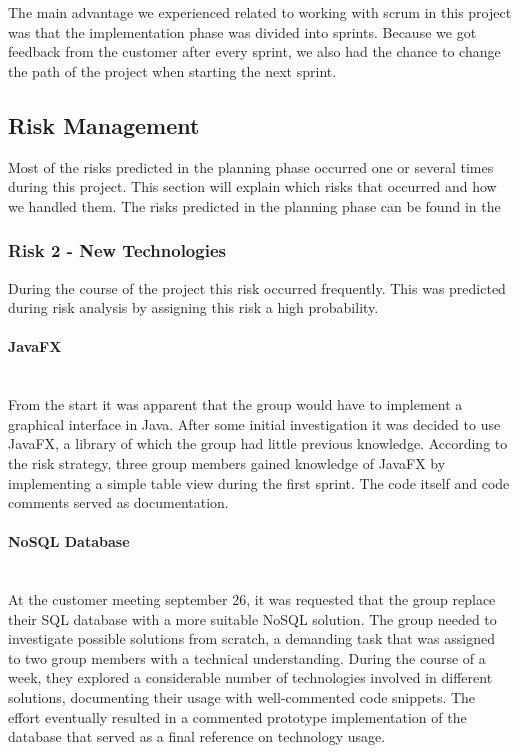 \documentclass[../document]{subfiles}
\begin{document}
The main advantage we experienced related to working with scrum in this project was that the implementation phase was divided into sprints. Because we got feedback from the customer after every sprint, we also had the chance to change the path of the project when starting the next sprint.  

\subsection{Risk Management}
\label{risk_management}
Most of the risks predicted in the planning phase occurred one or several times during this project. This section will explain which risks that occurred and how we handled them.  The risks predicted in the planning phase can be found in the 

\subsubsection{Risk 2 - New Technologies}
During the course of the project this risk occurred frequently. This was predicted during risk analysis by assigning this risk a high probability. 

\paragraph{JavaFX} \ \\
From the start it was apparent that the group would have to implement a graphical interface in Java. After some initial investigation it was decided to use JavaFX, a library of which the group had little previous knowledge. According to the risk strategy, three group members gained knowledge of JavaFX by implementing a simple table view during the first sprint. The code itself and code comments served as documentation. 

\paragraph{NoSQL Database} \ \\
At the customer meeting september 26, it was requested that the group replace their SQL database with a more suitable NoSQL solution. The group needed to investigate possible solutions from scratch, a demanding task that was assigned to two group members with a technical understanding. During the course of a week, they explored a considerable number of technologies involved in different solutions, documenting their usage with well-commented code snippets. The effort eventually resulted in a commented prototype implementation of the database that served as a final reference on technology usage.
\end{document}
